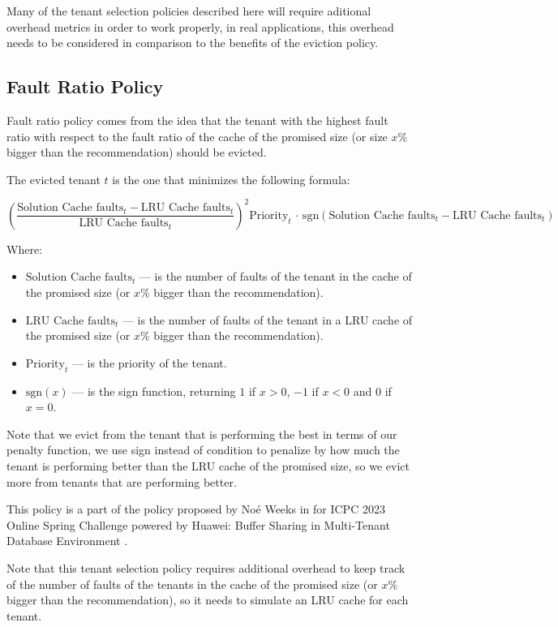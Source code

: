 Many of the tenant selection policies described here will require aditional overhead 
metrics in order to work properly, in real applications, this overhead needs to be 
considered in comparison to the benefits of the eviction policy.

\subsection{Fault Ratio Policy}

Fault ratio policy comes from the idea that the tenant with the highest fault ratio
with respect to the fault ratio of the cache of the promised size (or size $x\%$ bigger than
the recommendation) should be evicted.

The evicted tenant $t$ is the one that minimizes the following formula:

$$
\left( \frac{\text{Solution Cache faults}_t - \text{LRU Cache faults}_t}{\text{LRU Cache faults}_t} \right) ^2 \text{Priority}_t \, \cdot \, \text{sgn}( \text{Solution Cache faults}_t - \text{LRU Cache faults}_t )
$$

Where:

\begin{itemize}
    \item $\text{Solution Cache faults}_t$ --- is the number of faults of the tenant in the cache of the promised size (or $x\%$ bigger than the recommendation).
    \item $\text{LRU Cache faults}_t$ --- is the number of faults of the tenant in a LRU cache of the promised size (or $x\%$ bigger than the recommendation).
    \item $\text{Priority}_t$ --- is the priority of the tenant.
    \item $\text{sgn}(x)$ --- is the sign function, returning $1$ if $x > 0$, $-1$ if $x < 0$ and $0$ if $x = 0$.
\end{itemize}

Note that we evict from the tenant that is performing the best in terms of our penalty
function, we use sign instead of condition to penalize by how much the tenant is performing
better than the LRU cache of the promised size, so we evict more from tenants that are
performing better.

This policy is a part of the policy proposed by Noé Weeks in \cite{noe-weeks-comments} for 
ICPC 2023 Online Spring Challenge powered by Huawei: Buffer Sharing in Multi-Tenant Database Environment \cite{huawei-challenge}.

Note that this tenant selection policy requires additional overhead to keep track of the
number of faults of the tenants in the cache of the promised size (or $x\%$ bigger than the recommendation),
so it needs to simulate an LRU cache for each tenant.

